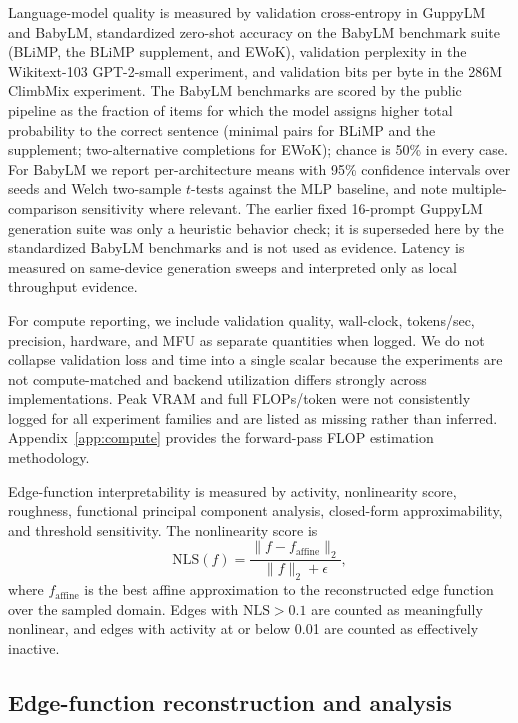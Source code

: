 \documentclass[11pt]{article}
\newcommand{\nls}{\mathrm{NLS}}
\begin{document}
Language-model quality is measured by validation cross-entropy in GuppyLM and BabyLM, standardized zero-shot accuracy on the BabyLM benchmark suite (BLiMP, the BLiMP supplement, and EWoK), validation perplexity in the Wikitext-103 GPT-2-small experiment, and validation bits per byte in the 286M ClimbMix experiment. The BabyLM benchmarks are scored by the public pipeline as the fraction of items for which the model assigns higher total probability to the correct sentence (minimal pairs for BLiMP and the supplement; two-alternative completions for EWoK); chance is 50\% in every case. For BabyLM we report per-architecture means with 95\% confidence intervals over seeds and Welch two-sample \(t\)-tests against the MLP baseline, and note multiple-comparison sensitivity where relevant. The earlier fixed 16-prompt GuppyLM generation suite was only a heuristic behavior check; it is superseded here by the standardized BabyLM benchmarks and is not used as evidence. Latency is measured on same-device generation sweeps and interpreted only as local throughput evidence.

For compute reporting, we include validation quality, wall-clock, tokens/sec, precision, hardware, and MFU as separate quantities when logged. We do not collapse validation loss and time into a single scalar because the experiments are not compute-matched and backend utilization differs strongly across implementations. Peak VRAM and full FLOPs/token were not consistently logged for all experiment families and are listed as missing rather than inferred. Appendix~\ref{app:compute} provides the forward-pass FLOP estimation methodology.

Edge-function interpretability is measured by activity, nonlinearity score, roughness, functional principal component analysis, closed-form approximability, and threshold sensitivity. The nonlinearity score is
\[
\nls(f)=\frac{\lVert f-f_{\mathrm{affine}}\rVert_2}{\lVert f\rVert_2+\epsilon},
\]
where \(f_{\mathrm{affine}}\) is the best affine approximation to the reconstructed edge function over the sampled domain. Edges with \(\nls>0.1\) are counted as meaningfully nonlinear, and edges with activity at or below 0.01 are counted as effectively inactive.

\subsection{Edge-function reconstruction and analysis}
\end{document}
